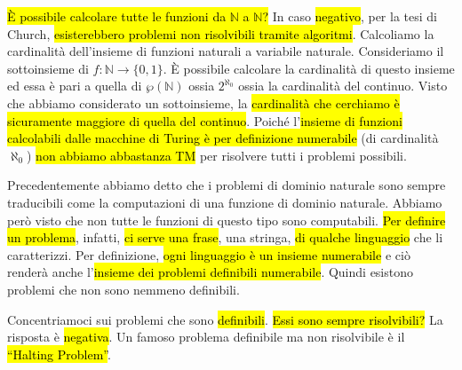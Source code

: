 \documentclass[a4paper,11pt,twoside]{article}
\theoremstyle{plain}
\theoremstyle{definition}
\theoremstyle{remark}
\begin{document}
\hl{È possibile calcolare tutte le funzioni da $\mathbb{N}$ a $\mathbb{N}$?} In
caso \hl{negativo}, per la tesi di Church, \hl{esisterebbero problemi non
risolvibili tramite algoritmi}. Calcoliamo la cardinalità dell'insieme di
funzioni naturali a variabile naturale. Consideriamo il sottoinsieme di $f:
\mathbb{N} \to \{0,1\}$. È possibile calcolare la cardinalità di questo insieme
ed essa è pari a quella di $\wp(\mathbb{N})$ ossia $2^{\aleph_0}$ ossia la
cardinalità del continuo. Visto che abbiamo considerato un sottoinsieme, la
\hl{cardinalità che cerchiamo è sicuramente maggiore di quella del continuo}.
Poiché l'\hl{insieme di funzioni calcolabili dalle macchine di Turing è per
definizione numerabile} (di cardinalità $\aleph_0$) \hl{non abbiamo abbastanza
TM} per risolvere tutti i problemi possibili.

Precedentemente abbiamo detto che i problemi di dominio naturale sono sempre
traducibili come la computazioni di una funzione di dominio naturale. Abbiamo
però visto che non tutte le funzioni di questo tipo sono computabili. \hl{Per
definire un problema}, infatti, \hl{ci serve una frase}, una stringa, \hl{di
qualche linguaggio} che li caratterizzi. Per definizione, \hl{ogni linguaggio è
un insieme numerabile} e ciò renderà anche l'\hl{insieme dei problemi definibili
numerabile}. Quindi esistono problemi che non sono nemmeno definibili.

Concentriamoci sui problemi che sono \hl{definibili}. \hl{Essi sono sempre
risolvibili?} La risposta è \hl{negativa}. Un famoso problema definibile ma non
risolvibile è il \hl{``Halting Problem''}.
\end{document}
